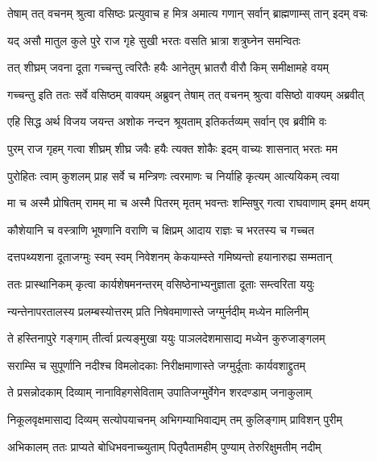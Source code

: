 
\twolineshloka
{तेषाम् तत् वचनम् श्रुत्वा वसिष्ठः प्रत्युवाच ह}
{मित्र अमात्य गणान् सर्वान् ब्राह्मणाम्स् तान् इदम् वचः} %

\twolineshloka
{यद् असौ मातुल कुले पुरे राज गृहे सुखी}
{भरतः वसति भ्रात्रा शत्रुघ्नेन समन्वितः} %

\twolineshloka
{तत् शीघ्रम् जवना दूता गच्चन्तु त्वरितैः हयैः}
{आनेतुम् भ्रातरौ वीरौ किम् समीक्षामहे वयम्} %

\twolineshloka
{गच्चन्तु इति ततः सर्वे वसिष्ठम् वाक्यम् अब्रुवन्}
{तेषाम् तत् वचनम् श्रुत्वा वसिष्ठो वाक्यम् अब्रवीत्} %

\twolineshloka
{एहि सिद्ध अर्थ विजय जयन्त अशोक नन्दन}
{श्रूयताम् इतिकर्तव्यम् सर्वान् एव ब्रवीमि वः} %

\twolineshloka
{पुरम् राज गृहम् गत्वा शीघ्रम् शीघ्र जवैः हयैः}
{त्यक्त शोकैः इदम् वाच्यः शासनात् भरतः मम} %

\twolineshloka
{पुरोहितः त्वाम् कुशलम् प्राह सर्वे च मन्त्रिणः}
{त्वरमाणः च निर्याहि कृत्यम् आत्ययिकम् त्वया} %

\twolineshloka
{मा च अस्मै प्रोषितम् रामम् मा च अस्मै पितरम् मृतम्}
{भवन्तः शम्सिषुर् गत्वा राघवाणाम् इमम् क्षयम्} %

\twolineshloka
{कौशेयानि च वस्त्राणि भूषणानि वराणि च}
{क्षिप्रम् आदाय राज्ञः च भरतस्य च गच्चत} %

\twolineshloka
{दत्तपथ्यशना दूताजग्मुः स्वम् स्वम् निवेशनम्}
{केकयाम्स्ते गमिष्यन्तो हयानारुह्य सम्मतान्} %

\twolineshloka
{ततः प्रास्थानिकम् कृत्वा कार्यशेषमनन्तरम्}
{वसिष्ठेनाभ्यनुज्ञाता दूताः सम्त्वरिता ययुः} %

\twolineshloka
{न्यन्तेनापरतालस्य प्रलम्बस्योत्तरम् प्रति}
{निषेवमाणास्ते जग्मुर्नदीम् मध्येन मालिनीम्} %

\twolineshloka
{ते हस्तिनापुरे गङ्गाम् तीर्त्वा प्रत्यङ्मुखा ययुः}
{पाञलदेशमासाद्य मध्येन कुरुजाङ्गलम्} %

\twolineshloka
{सराम्सि च सुपूर्णानि नदीश्च विमलोदकाः}
{निरीक्षमाणास्ते जग्मुर्दूताः कार्यवशाद्द्रुतम्} %

\twolineshloka
{ते प्रसन्नोदकाम् दिव्याम् नानाविहगसेविताम्}
{उपातिजग्मुर्वेगेन शरदण्डाम् जनाकुलाम्} %

\twolineshloka
{निकूलवृक्षमासाद्य दिव्यम् सत्योपयाचनम्}
{अभिगम्याभिवाद्यम् तम् कुलिङ्गाम् प्राविशन् पुरीम्} %

\twolineshloka
{अभिकालम् ततः प्राप्यते बोधिभवनाच्च्युताम्}
{पितृपैतामहीम् पुण्याम् तेरुरिक्षुमतीम् नदीम्} %

